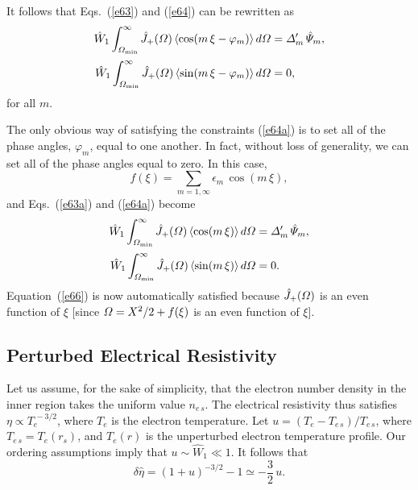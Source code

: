 \documentclass[12pt,prb,aps]{revtex4-1}
\begin{document}
It follows that Eqs.~(\ref{e63}) and (\ref{e64}) can be rewritten as
\begin{align}\label{e63a}
\hat{W}_1\int_{{\mit\Omega}_{\rm min}}^\infty\hat{J}_+({\mit\Omega})\,\langle\cos(m\,\xi-\varphi_m)\rangle\,d{\mit\Omega}&= {\mit\Delta}_m'\,\hat{\mit\Psi}_m,\\[0.5ex]
\hat{W}_1\int_{{\mit\Omega}_{\rm min}}^\infty\hat{J}_+({\mit\Omega})\,\langle\sin(m\,\xi-\varphi_m)\rangle\,d{\mit\Omega}&=0,\label{e64a}
\end{align}
for all $m$. 

The only obvious way of satisfying the constraints (\ref{e64a}) is to set all of the phase angles, $\varphi_m$, equal to
one another. In fact, without loss of generality, we can set all of the phase angles equal to zero. In this case,
\begin{equation}\label{e65}
f(\xi) = \sum_{m=1,\infty} \epsilon_m\,\cos(m\,\xi),
\end{equation}
and Eqs.~(\ref{e63a}) and (\ref{e64a}) become 
\begin{align}\label{e65a}
\hat{W}_1\int_{{\mit\Omega}_{\rm min}}^\infty\hat{J}_+({\mit\Omega})\,\langle\cos(m\,\xi)\rangle\,d{\mit\Omega}&= {\mit\Delta}_m'\,\hat{\mit\Psi}_m,\\[0.5ex]
\hat{W}_1\int_{{\mit\Omega}_{\rm min}}^\infty\hat{J}_+({\mit\Omega})\,\langle\sin(m\,\xi)\rangle\,d{\mit\Omega}&=0.\label{e66}
\end{align}
Equation~(\ref{e66}) is now automatically satisfied because $\hat{J}_+({\mit\Omega})$ is an even function of $\xi$ [since ${\mit\Omega}= X^2/2+f(\xi)$ is an even function of $\xi$]. 

\subsection{Perturbed Electrical Resistivity}
Let us assume, for the sake of simplicity, that the electron
number density in the inner region takes the uniform value
$n_{e\,s}$. The electrical resistivity thus satisfies $\eta\propto
T_e^{\,-3/2}$, where $T_e$ is the electron temperature.\cite{plasma} Let $u=(T_e-T_{e\,s})/T_{e\,s}$, where $T_{e\,s} = T_e(r_s)$, and
$T_e(r)$ is the unperturbed electron temperature profile. Our ordering assumptions imply that $u\sim \hat{W}_1\ll 1$. It follows
that
\begin{equation}
\delta{\hat\eta} = (1+u)^{-3/2} - 1\simeq -\frac{3}{2}\,u.
\end{equation}
\end{document}
